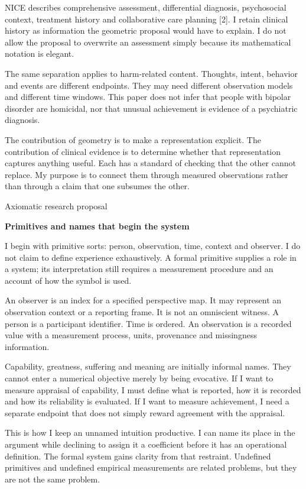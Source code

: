 \documentclass[10pt]{article}
\begin{document}
NICE describes comprehensive assessment, differential diagnosis, psychosocial context, treatment history and collaborative care planning [2]. I retain clinical history as information the geometric proposal would have to explain. I do not allow the proposal to overwrite an assessment simply because its mathematical notation is elegant.\par
The same separation applies to harm-related content. Thoughts, intent, behavior and events are different endpoints. They may need different observation models and different time windows. This paper does not infer that people with bipolar disorder are homicidal, nor that unusual achievement is evidence of a psychiatric diagnosis.\par
The contribution of geometry is to make a representation explicit. The contribution of clinical evidence is to determine whether that representation captures anything useful. Each has a standard of checking that the other cannot replace. My purpose is to connect them through measured observations rather than through a claim that one subsumes the other.\par
\clearpage
{\small\color{accent}Axiomatic research proposal}\par
{\LARGE\bfseries\color{ink}Primitives and names that begin the system}\par\vspace{7pt}
I begin with primitive sorts: person, observation, time, context and observer. I do not claim to define experience exhaustively. A formal primitive supplies a role in a system; its interpretation still requires a measurement procedure and an account of how the symbol is used.\par
An observer is an index for a specified perspective map. It may represent an observation context or a reporting frame. It is not an omniscient witness. A person is a participant identifier. Time is ordered. An observation is a recorded value with a measurement process, units, provenance and missingness information.\par
Capability, greatness, suffering and meaning are initially informal names. They cannot enter a numerical objective merely by being evocative. If I want to measure appraisal of capability, I must define what is reported, how it is recorded and how its reliability is evaluated. If I want to measure achievement, I need a separate endpoint that does not simply reward agreement with the appraisal.\par
This is how I keep an unnamed intuition productive. I can name its place in the argument while declining to assign it a coefficient before it has an operational definition. The formal system gains clarity from that restraint. Undefined primitives and undefined empirical measurements are related problems, but they are not the same problem.\par
\end{document}
